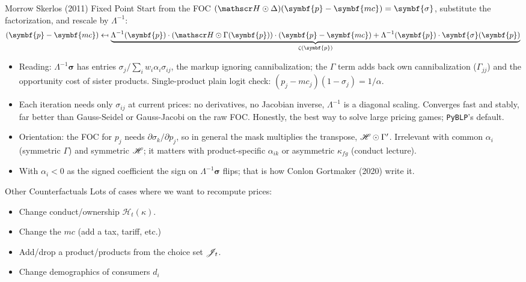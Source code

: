\documentclass[aspectratio=169,10pt]{beamer}
\begin{document}
\begin{frame}{Morrow Skerlos (2011) Fixed Point}
\small
Start from the FOC $(\calH \odot \Delta)(\symbf{p} - \symbf{mc}) = \symbf{\sigma}$, substitute the factorization, and rescale by $\Lambda^{-1}$:
\begin{align*}
(\symbf{p}-\symbf{mc} ) \mapsfrom \underbrace{\Lambda^{-1}(\symbf{p}) \cdot (\calH \odot \Gamma(\symbf{p}))\cdot(\symbf{p}- \symbf{mc}) + \Lambda^{-1}(\symbf{p})\cdot \symbf{\sigma}(\symbf{p})}_{\zeta(\symbf{p})}
\end{align*}
\vspace{-0.3cm}
\begin{itemize}
\item Reading: $\Lambda^{-1} \symbf{\sigma}$ has entries $\sigma_j / \sum_i w_i \alpha_i \sigma_{ij}$, the markup ignoring cannibalization; the $\Gamma$ term adds back own cannibalization ($\Gamma_{jj}$) and the opportunity cost of sister products. Single-product plain logit check: $(p_j - mc_j)(1-\sigma_j) = 1/\alpha$.
\item Each iteration needs only $\sigma_{ij}$ at current prices: no derivatives, no Jacobian inverse, $\Lambda^{-1}$ is a diagonal scaling. Converges fast and stably, far better than Gauss-Seidel or Gauss-Jacobi on the raw FOC. Honestly, the best way to solve large pricing games; \texttt{PyBLP}'s default.
\item Orientation: the FOC for $p_j$ needs $\partial \sigma_k/\partial p_j$, so in general the mask multiplies the \alert{transpose}, $\mathscr{H} \odot \Gamma'$. Irrelevant with common $\alpha_i$ (symmetric $\Gamma$) and symmetric $\mathscr{H}$; it matters with product-specific $\alpha_{ik}$ or asymmetric $\kappa_{fg}$ (conduct lecture).
\item With $\alpha_i < 0$ as the signed coefficient the sign on $\Lambda^{-1}\symbf{\sigma}$ flips; that is how Conlon Gortmaker (2020) write it.
\end{itemize}
\end{frame}



\begin{frame}{Other Counterfactuals}
Lots of cases where we want to recompute prices:
\begin{itemize}
\item Change conduct/ownership $\mathcal{H}_t(\kappa)$.
\item Change the $mc$ (add a tax, tariff, etc.)
\item Add/drop a product/products from the choice set $\mathscr{J}_t$.
\item Change demographics of consumers $d_i$
\end{itemize}
\end{frame}
\end{document}
